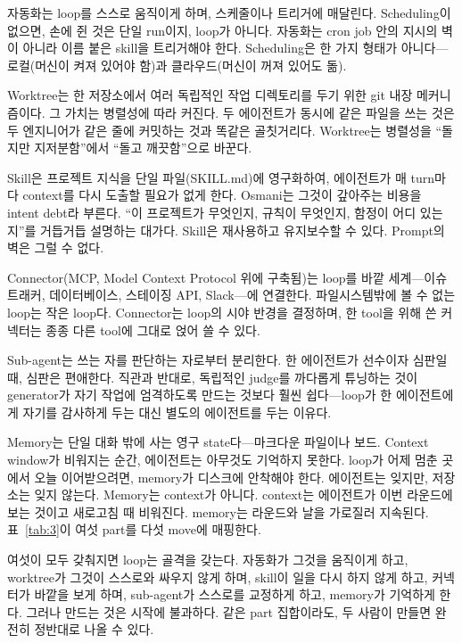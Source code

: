 \documentclass[conference]{IEEEtran}
\begin{document}
자동화는 loop를 스스로 움직이게 하며, 스케줄이나 트리거에 매달린다. Scheduling이 없으면, 손에 쥔 것은 단일 run이지, loop가 아니다. 자동화는 cron job 안의 지시의 벽이 아니라 이름 붙은 skill을 트리거해야 한다. Scheduling은 한 가지 형태가 아니다---로컬(머신이 켜져 있어야 함)과 클라우드(머신이 꺼져 있어도 돎).

Worktree는 한 저장소에서 여러 독립적인 작업 디렉토리를 두기 위한 git 내장 메커니즘이다. 그 가치는 병렬성에 따라 커진다. 두 에이전트가 동시에 같은 파일을 쓰는 것은 두 엔지니어가 같은 줄에 커밋하는 것과 똑같은 골칫거리다. Worktree는 병렬성을 ``돌지만 지저분함''에서 ``돌고 깨끗함''으로 바꾼다.

Skill은 프로젝트 지식을 단일 파일(SKILL.md)에 영구화하여, 에이전트가 매 turn마다 context를 다시 도출할 필요가 없게 한다. Osmani는 그것이 갚아주는 비용을 intent debt라 부른다. ``이 프로젝트가 무엇인지, 규칙이 무엇인지, 함정이 어디 있는지''를 거듭거듭 설명하는 대가다. Skill은 재사용하고 유지보수할 수 있다. Prompt의 벽은 그럴 수 없다.

Connector(MCP, Model Context Protocol 위에 구축됨)는 loop를 바깥 세계---이슈 트래커, 데이터베이스, 스테이징 API, Slack---에 연결한다. 파일시스템밖에 볼 수 없는 loop는 작은 loop다. Connector는 loop의 시야 반경을 결정하며, 한 tool을 위해 쓴 커넥터는 종종 다른 tool에 그대로 얹어 쓸 수 있다.

Sub-agent는 쓰는 자를 판단하는 자로부터 분리한다. 한 에이전트가 선수이자 심판일 때, 심판은 편애한다. 직관과 반대로, 독립적인 judge를 까다롭게 튜닝하는 것이 generator가 자기 작업에 엄격하도록 만드는 것보다 훨씬 쉽다---loop가 한 에이전트에게 자기를 감사하게 두는 대신 별도의 에이전트를 두는 이유다.

Memory는 단일 대화 밖에 사는 영구 state다---마크다운 파일이나 보드. Context window가 비워지는 순간, 에이전트는 아무것도 기억하지 못한다. loop가 어제 멈춘 곳에서 오늘 이어받으려면, memory가 디스크에 안착해야 한다. 에이전트는 잊지만, 저장소는 잊지 않는다. Memory는 context가 아니다. context는 에이전트가 이번 라운드에 보는 것이고 새로고침 때 비워진다. memory는 라운드와 날을 가로질러 지속된다. 표~\ref{tab:3}이 여섯 part를 다섯 move에 매핑한다.

여섯이 모두 갖춰지면 loop는 골격을 갖는다. 자동화가 그것을 움직이게 하고, worktree가 그것이 스스로와 싸우지 않게 하며, skill이 일을 다시 하지 않게 하고, 커넥터가 바깥을 보게 하며, sub-agent가 스스로를 교정하게 하고, memory가 기억하게 한다. 그러나 만드는 것은 시작에 불과하다. 같은 part 집합이라도, 두 사람이 만들면 완전히 정반대로 나올 수 있다.
\end{document}
